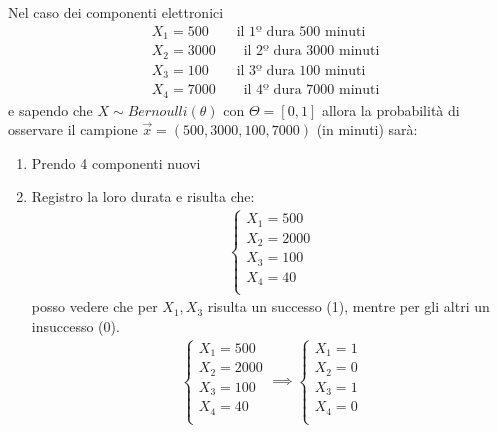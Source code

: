 \documentclass{article}  %
\theoremstyle{definition}
\begin{document}
\begin{esempio}
	Nel caso dei componenti elettronici
	\begin{align*}
		 & X_1 = 500 \quad \quad \text{il 1º dura 500 minuti}   \\
		 & X_2 = 3000 \quad \quad \text{il 2º dura 3000 minuti} \\
		 & X_3 = 100 \quad \quad \text{il 3º dura 100 minuti}   \\
		 & X_4 = 7000 \quad \quad \text{il 4º dura 7000 minuti}
	\end{align*}
	e sapendo che $X \sim Bernoulli(\theta)$ con $\Theta =  [0,1]$ allora la probabilità di osservare il campione $\vec{x}=(500,3000,100,7000)$ (in minuti) sarà:
	\begin{enumerate}
		\item Prendo 4 componenti nuovi
		\item Registro la loro durata e risulta che:
		      \begin{align*}
			      \begin{cases}
				      X_1 = 500  \\
				      X_2 = 2000 \\
				      X_3 = 100  \\
				      X_4 = 40   \\
			      \end{cases}
		      \end{align*}
		      posso vedere che per $X_1,X_3$ risulta un successo (1), mentre per gli altri un insuccesso (0).
		      \begin{align*}
			      \begin{cases}
				      X_1 = 500  \\
				      X_2 = 2000 \\
				      X_3 = 100  \\
				      X_4 = 40   \\
			      \end{cases}
			      \implies
			      \begin{cases}
				      X_1 = 1 \\
				      X_2 = 0 \\
				      X_3 = 1 \\
				      X_4 = 0 \\
			      \end{cases}
		      \end{align*}



\end{enumerate}
\end{esempio}
\end{document}
